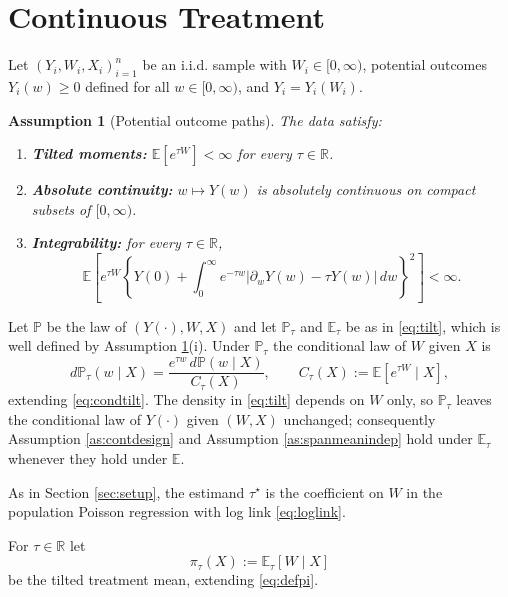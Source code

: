 \documentclass[11pt]{article}
\newtheorem{assumption}{Assumption}
\theoremstyle{definition}
\theoremstyle{plain}
\newcommand{\E}{\mathbb{E}}
\newcommand{\1}{\mathbf{1}}
\newcommand{\R}{\mathbb{R}}
\begin{document}
\section{Continuous Treatment}

Let $(Y_i,W_i,X_i)_{i=1}^n$ be an i.i.d. sample with $W_i\in[0,\infty)$, potential outcomes $Y_i(w)\ge 0$ defined for all $w\in[0,\infty)$, and $Y_i=Y_i(W_i)$.

\begin{assumption}[Potential outcome paths]
\label{as:contreg}
The data satisfy:
\begin{enumerate}[label=(\roman*)]
    \item \textbf{Tilted moments:} $\E[e^{\tau W}]<\infty$ for every $\tau\in\R$.
    \item \textbf{Absolute continuity:} $w\mapsto Y(w)$ is absolutely continuous on compact subsets of $[0,\infty)$.
    \item \textbf{Integrability:} for every $\tau\in\R$,
    \[
    \E\left[e^{\tau W}\left\{Y(0)+\int_0^\infty e^{-\tau w}\bigl|\partial_wY(w)-\tau Y(w)\bigr|\,dw\right\}^{2}\right]<\infty .
    \]
\end{enumerate}
\end{assumption}

Let $\mathbb P$ be the law of $(Y(\cdot),W,X)$ and let $\mathbb P_\tau$ and $\E_\tau$ be as in \eqref{eq:tilt}, which is well defined by Assumption \ref{as:contreg}(i).  Under $\mathbb P_\tau$ the conditional law of $W$ given $X$ is
\begin{equation}
d\mathbb P_\tau(w\mid X)=\frac{e^{\tau w}\,d\mathbb P(w\mid X)}{C_\tau(X)},
\qquad
C_\tau(X):=\E[e^{\tau W}\mid X],
\label{eq:contcondtilt}
\end{equation}
extending \eqref{eq:condtilt}.  The density in \eqref{eq:tilt} depends on $W$ only, so $\mathbb P_\tau$ leaves the conditional law of $Y(\cdot)$ given $(W,X)$ unchanged; consequently Assumption \ref{as:contdesign} and Assumption \ref{as:spanmeanindep} hold under $\E_\tau$ whenever they hold under $\E$.

As in Section \ref{sec:setup}, the estimand $\tau^\star$ is the coefficient on $W$ in the population Poisson regression with log link \eqref{eq:loglink}.

For $\tau\in\R$ let
\begin{equation}
\pi_\tau(X):=\E_\tau[W\mid X]
\label{eq:contdefpi}
\end{equation}
be the tilted treatment mean, extending \eqref{eq:defpi}.
\end{document}

